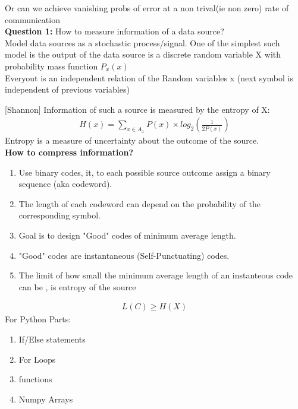 \documentclass{article}
\newlength\tindent
\renewcommand{\indent}{\hspace*{\tindent}}
\begin{document}
        Or can we achieve vanishing probs of error at a non trival(ie non zero) rate of communication\\\indent
        \textbf{Question 1:}
        How to measure information of a data source?\\\indent
        Model data sources as a stochastic process/signal. 
        One of the simplest such model is the output of the data source is 
        a discrete random variable X with probability mass function $P_x(x)$\\\indent
        Everyout is an independent relation of the Random variables
        x (next symbol is independent of previous variables)\\\indent

        [Shannon] Information of such a source is measured by the entropy of X:
        \begin{align}
            H(x) = \sum_{x \in A_x} {P(x)\times log_2(\frac{1}{2P(x)})}
        \end{align}
        Entropy is a measure of uncertainty about the outcome of the source.\\\indent
        \textbf{How to compress information?}
        \begin{enumerate}
            \item Use binary codes, it, to each possible source outcome assign a binary sequence (aka codeword).
            \item The length of each codeword can depend on the probability of the corresponding symbol.
            \item Goal is to design "Good" codes of minimum average length.
            \item "Good" codes are instantaneous (Self-Punctuating) codes.
            \item The limit of how small the minimum average length of an instanteous code can be , is entropy of the source
        \end{enumerate}
        \begin{align}
            L(C) \geq H(X)
        \end{align}
        For Python Parts:
        \begin{enumerate}[label=(\alph*)]
            \item If/Else statements
            \item For Loops
            \item functions
            \item Numpy Arrays
        \end{enumerate}
\end{document}
